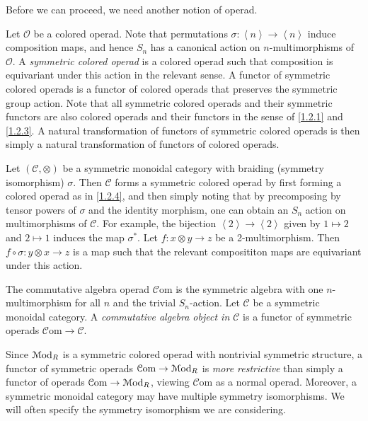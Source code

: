 Before we can proceed, we need another notion of operad.

\begin{definition}\label{1.3.3}
	Let $\mathcal{O} $ be a colored operad. Note that permutations $\sigma : \left\langle n \right\rangle  \to \left\langle n \right\rangle $ induce composition maps, and hence $S_n$ has a canonical action on $n$-multimorphisms of $\mathcal{O} $. A \emph{symmetric colored operad} is a colored operad such that composition is equivariant under this action in the relevant sense. A functor of symmetric colored operads is a functor of colored operads that preserves the symmetric group action. Note that all symmetric colored operads and their symmetric functors are also colored operads and their functors in the sense of \cref{1.2.1} and \cref{1.2.3}. A natural transformation of functors of symmetric colored operads is then simply a natural transformation of functors of colored operads.
\end{definition}

\begin{example}\label{1.3.4}
	Let $(\mathcal{C} ,\otimes )$ be a symmetric monoidal category with braiding (symmetry isomorphism) $\sigma $. Then $\mathcal{C} $ forms a symmetric colored operad by first forming a colored operad as in \cref{1.2.4}, and then simply noting that by precomposing by tensor powers of $\sigma $ and the identity morphism, one can obtain an $S_n$ action on multimorphisms of $\mathcal{C} $. For example, the bijection $\left\langle 2 \right\rangle \to \left\langle 2 \right\rangle $ given by $1\mapsto 2$ and $2\mapsto 1$ induces the map $\sigma ^*$. Let $f : x\otimes y \to z$ be a 2-multimorphism. Then $f\circ \sigma : y\otimes x \to z$ is a map such that the relevant composititon maps are equivariant under this action.
\end{example}

\begin{definition}\label{1.3.5}
	The commutative algebra operad $\mathcal{C} \mathrm{om} $ is the symmetric algebra with one $n$-multimorphism for all $n$ and the trivial $S_n$-action. Let $\mathcal{C} $ be a symmetric monoidal category. A \emph{commutative algebra object in $\mathcal{C} $} is a functor of symmetric operads $\mathcal{C} \mathrm{om} \to \mathcal{C} $.
\end{definition}

\begin{warning}\label{1.3.6}
	Since $\mathcal{M}\mathrm{od} _R$ is a symmetric colored operad with nontrivial symmetric structure, a functor of symmetric operads $\mathcal{C} \mathrm{om} \to \mathcal{M}\mathrm{od} _R$ is \emph{more restrictive} than simply a functor of operads $\mathcal{C} \mathrm{om} \to \mathcal{M}\mathrm{od} _R$, viewing $\mathcal{C} \mathrm{om} $ as a normal operad. Moreover, a symmetric monoidal category may have multiple symmetry isomorphisms. We will often specify the symmetry isomorphism we are considering.
\end{warning}

